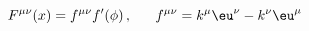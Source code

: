 \begin{equation}
F^{\mu\nu}(x)=f^{\mu\nu} f'(\phi)\,,~~~~~
f^{\mu\nu}=k^\mu\eu^\nu-k^\nu\eu^\mu
\end{equation}

